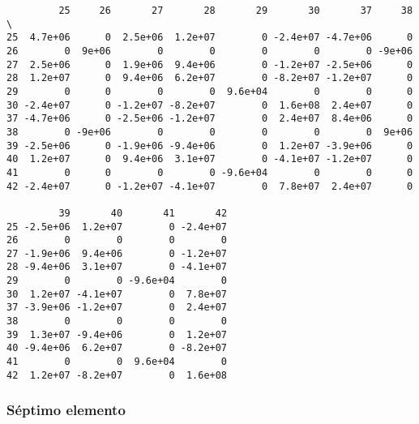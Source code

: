 \documentclass{article}
\begin{document}
    
    \begin{verbatim}
         25     26       27       28       29       30       37     38  \
25  4.7e+06      0  2.5e+06  1.2e+07        0 -2.4e+07 -4.7e+06      0   
26        0  9e+06        0        0        0        0        0 -9e+06   
27  2.5e+06      0  1.9e+06  9.4e+06        0 -1.2e+07 -2.5e+06      0   
28  1.2e+07      0  9.4e+06  6.2e+07        0 -8.2e+07 -1.2e+07      0   
29        0      0        0        0  9.6e+04        0        0      0   
30 -2.4e+07      0 -1.2e+07 -8.2e+07        0  1.6e+08  2.4e+07      0   
37 -4.7e+06      0 -2.5e+06 -1.2e+07        0  2.4e+07  8.4e+06      0   
38        0 -9e+06        0        0        0        0        0  9e+06   
39 -2.5e+06      0 -1.9e+06 -9.4e+06        0  1.2e+07 -3.9e+06      0   
40  1.2e+07      0  9.4e+06  3.1e+07        0 -4.1e+07 -1.2e+07      0   
41        0      0        0        0 -9.6e+04        0        0      0   
42 -2.4e+07      0 -1.2e+07 -4.1e+07        0  7.8e+07  2.4e+07      0   

         39       40       41       42  
25 -2.5e+06  1.2e+07        0 -2.4e+07  
26        0        0        0        0  
27 -1.9e+06  9.4e+06        0 -1.2e+07  
28 -9.4e+06  3.1e+07        0 -4.1e+07  
29        0        0 -9.6e+04        0  
30  1.2e+07 -4.1e+07        0  7.8e+07  
37 -3.9e+06 -1.2e+07        0  2.4e+07  
38        0        0        0        0  
39  1.3e+07 -9.4e+06        0  1.2e+07  
40 -9.4e+06  6.2e+07        0 -8.2e+07  
41        0        0  9.6e+04        0  
42  1.2e+07 -8.2e+07        0  1.6e+08  
    \end{verbatim}

    
    \subsubsection{Séptimo elemento}\label{suxe9ptimo-elemento}
\end{document}
